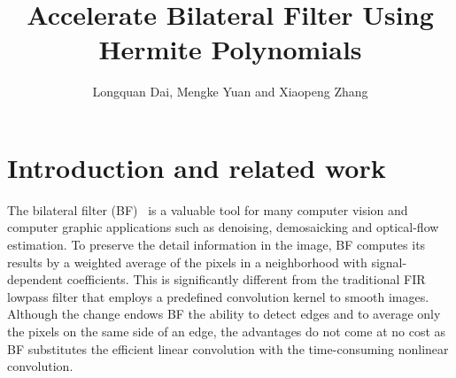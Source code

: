 \documentclass[twocolumn]{el-author}
\begin{document}
\title{Accelerate Bilateral Filter Using Hermite Polynomials}

\author{Longquan Dai, Mengke Yuan and Xiaopeng Zhang}


\maketitle

\section{Introduction and related work}

The bilateral filter (BF)~\cite{Tomasi_ICCV_1998} is a valuable tool for many computer vision and computer graphic applications such as denoising, demosaicking and optical-flow estimation. To preserve the detail information in the image, BF computes its results by a weighted average of the pixels in a neighborhood with signal-dependent coefficients. This is significantly different from the traditional FIR lowpass filter that employs a predefined convolution kernel to smooth images. Although the change endows BF the ability to detect edges and to average only the pixels on the same side of an edge, the advantages do not come at no cost as BF substitutes the efficient linear convolution with the time-consuming nonlinear convolution.
\end{document}
